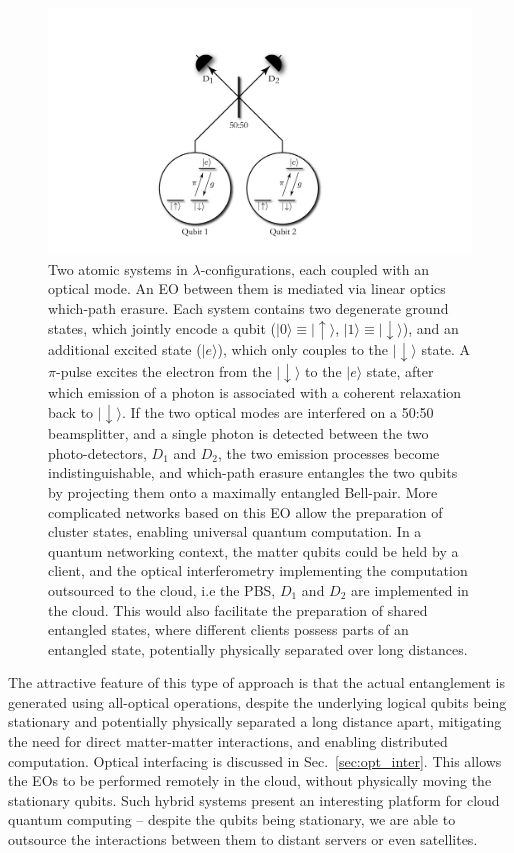 \documentclass[aps, rmp, twocolumn, amsmath, amssymb, nofootinbib, superscriptaddress, longbibliography, floatfix, table-of-contents, eqsecnum]{revtex4-1}
\newcommand{\ket}[1]{|#1\rangle}
\begin{document}
\begin{figure}[!htb]
\includegraphics[width=0.75\columnwidth]{barrett_kok}
\caption{Two atomic systems in $\lambda$-configurations, each coupled with an optical mode. An EO between them is mediated via linear optics which-path erasure. Each system contains two degenerate ground states, which jointly encode a qubit (\mbox{$\ket{0}\equiv\ket{\!\uparrow}$}, \mbox{$\ket{1}\equiv\ket{\!\downarrow}$}), and an additional excited state ($\ket{e}$), which only couples to the $\ket{\!\downarrow}$ state. A $\pi$-pulse excites the electron from the $\ket{\!\downarrow}$ to the $\ket{e}$ state, after which emission of a photon is associated with a coherent relaxation back to $\ket{\!\downarrow}$. If the two optical modes are interfered on a 50:50 beamsplitter, and a single photon is detected between the two photo-detectors, $D_1$ and $D_2$, the two emission processes become indistinguishable, and which-path erasure entangles the two qubits by projecting them onto a maximally entangled Bell-pair. More complicated networks based on this EO allow the preparation of cluster states, enabling universal quantum computation. In a quantum networking context, the matter qubits could be held by a client, and the optical interferometry implementing the computation outsourced to the cloud, i.e the PBS, $D_1$ and $D_2$ are implemented in the cloud. This would also facilitate the preparation of shared entangled states, where different clients possess parts of an entangled state, potentially physically separated over long distances.} \label{fig:barrett_kok}
\end{figure}

The attractive feature of this type of approach is that the actual entanglement is generated using all-optical operations, despite the underlying logical qubits being stationary and potentially physically separated a long distance apart, mitigating the need for direct matter-matter interactions, and enabling distributed computation. Optical interfacing is discussed in Sec.~\ref{sec:opt_inter}. This allows the EOs to be performed remotely in the cloud, without physically moving the stationary qubits. Such hybrid systems present an interesting platform for cloud quantum computing -- despite the qubits being stationary, we are able to outsource the interactions between them to distant servers or even satellites.
\end{document}
